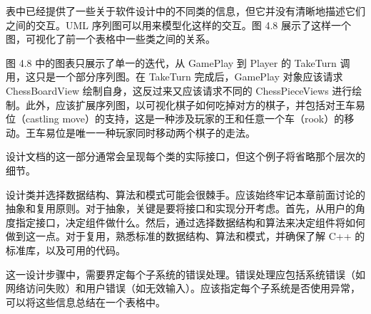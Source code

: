 表中已经提供了一些关于软件设计中的不同类的信息，但它并没有清晰地描述它们之间的交互。UML 序列图可以用来模型化这样的交互。图 4.8 展示了这样一个图，可视化了前一个表格中一些类之间的关系。


图 4.8 中的图表只展示了单一的迭代，从 GamePlay 到 Player 的 TakeTurn 调用，这只是一个部分序列图。在 TakeTurn 完成后，GamePlay 对象应该请求 ChessBoardView 绘制自身，这反过来又应该请求不同的 ChessPieceViews 进行绘制。此外，应该扩展序列图，以可视化棋子如何吃掉对方的棋子，并包括对王车易位（castling move）的支持，这是一种涉及玩家的王和任意一个车（rook）的移动。王车易位是唯一一种玩家同时移动两个棋子的走法。

设计文档的这一部分通常会呈现每个类的实际接口，但这个例子将省略那个层次的细节。

设计类并选择数据结构、算法和模式可能会很棘手。应该始终牢记本章前面讨论的抽象和复用原则。对于抽象，关键是要将接口和实现分开考虑。首先，从用户的角度指定接口，决定组件做什么。然后，通过选择数据结构和算法来决定组件将如何做到这一点。对于复用，熟悉标准的数据结构、算法和模式，并确保了解 C++ 的标准库，以及可用的代码。


这一设计步骤中，需要界定每个子系统的错误处理。错误处理应包括系统错误（如网络访问失败）和用户错误（如无效输入）。应该指定每个子系统是否使用异常，可以将这些信息总结在一个表格中。

